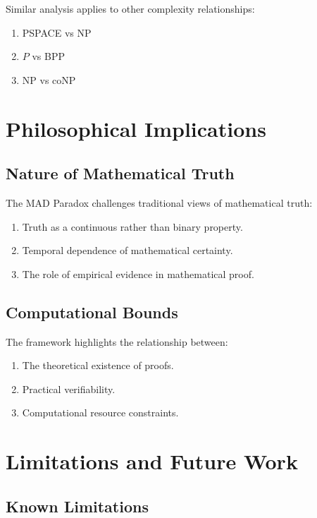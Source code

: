 \documentclass[11pt]{article}
\begin{document}
Similar analysis applies to other complexity relationships:
\begin{enumerate}[label=(\arabic*)]
    \item PSPACE vs NP
    \item $P$ vs BPP
    \item NP vs coNP
\end{enumerate}

\section{Philosophical Implications}

\subsection{Nature of Mathematical Truth}

The MAD Paradox challenges traditional views of mathematical truth:
\begin{enumerate}[label=(\arabic*)]
    \item Truth as a continuous rather than binary property.
    \item Temporal dependence of mathematical certainty.
    \item The role of empirical evidence in mathematical proof.
\end{enumerate}

\subsection{Computational Bounds}

The framework highlights the relationship between:
\begin{enumerate}[label=(\arabic*)]
    \item The theoretical existence of proofs.
    \item Practical verifiability.
    \item Computational resource constraints.
\end{enumerate}

\section{Limitations and Future Work}

\subsection{Known Limitations}
\end{document}
